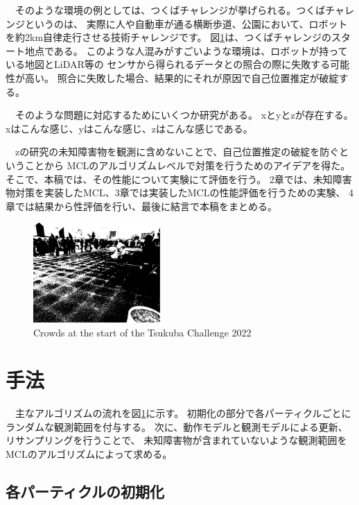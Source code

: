 \documentclass{jarticle}
\begin{document}
　そのような環境の例としては、つくばチャレンジ\cite{つくばチャレンジ}が挙げられる。つくばチャレンジというのは、
実際に人や自動車が通る横断歩道、公園において、ロボットを約2km自律走行させる技術チャレンジです。
図\ref{fig: つくばチャレンジ人混み}は、つくばチャレンジのスタート地点である。
このような人混みがすごいような環境は、ロボットが持っている地図とLiDAR等の
センサから得られるデータとの照合の際に失敗する可能性が高い。
照合に失敗した場合、結果的にそれが原因で自己位置推定が破綻する。

　そのような問題に対応するためにいくつか研究がある。
xとyとzが存在する。xはこんな感じ、yはこんな感じ、zはこんな感じである。

　zの研究の未知障害物を観測に含めないことで、自己位置推定の破綻を防ぐということから
MCLのアルゴリズムレベルで対策を行うためのアイデアを得た。
そこで、本稿では、その性能について実験にて評価を行う。
2章では、未知障害物対策を実装したMCL、3章では実装したMCLの性能評価を行うための実験、
4章では結果から性評価を行い、最後に結言で本稿をまとめる。

\begin{figure}[h]
  \centering
   \includegraphics[height=38mm]{fig/hitogomi.eps}
   \vspace*{-4mm}
   \caption{Crowds at the start of the Tsukuba Challenge 2022}
   \label{fig: つくばチャレンジ人混み}
 \end{figure}

\section{手法}%

　主なアルゴリズムの流れを図\ref{fig: つくばチャレンジ人混み}に示す。
初期化の部分で各パーティクルごとにランダムな観測範囲を付与する。
次に、動作モデルと観測モデルによる更新、リサンプリングを行うことで、
未知障害物が含まれていないような観測範囲をMCLのアルゴリズムによって求める。


\subsection{各パーティクルの初期化}
\end{document}
